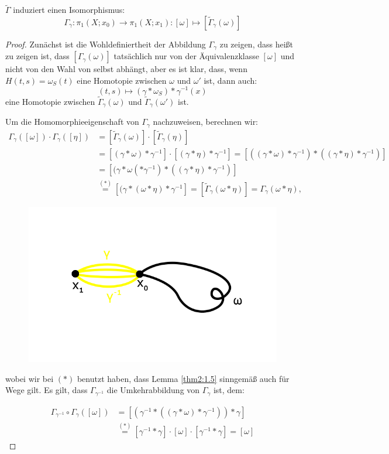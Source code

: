 \documentclass[a4paper,10pt]{scrartcl}
\begin{document}
\begin{st}\label{thm2:1.15}
 $\tilde \Gamma$ induziert einen Isomorphismus:
\[
 \Gamma_\gamma: \pi_1(X;x_0)\to \pi_1(X;x_1): [\omega] \mapsto [\tilde \Gamma_{\gamma}(\omega)]
\]
\end{st}
\begin{proof}
 Zunächst ist die Wohldefiniertheit der Abbildung $\Gamma_\gamma$ zu zeigen, dass heißt zu zeigen ist, dass $[\Gamma_{\gamma} (\omega)]$ tatsächlich nur von der Äquivalenzklasse $[\omega]$ und nicht von den Wahl von selbst abhängt, aber es ist klar, dass, wenn $H(t,s)=\omega_S(t)$ eine Homotopie zwischen $\omega$ und $\omega'$ ist, dann auch:
\[
 (t,s)\mapsto (\gamma*\omega_S)*\gamma^{-1}(x)
\]
eine Homotopie zwischen $\tilde \Gamma_{\gamma}(\omega)$ und $\tilde \Gamma_{\gamma}(\omega')$ ist. 

Um die Homomorphieeigenschaft von $\Gamma_{\gamma}$ nachzuweisen, berechnen wir: 
\begin{align*}
 \Gamma_{\gamma}([\omega])\cdot \Gamma_{\gamma} ([\eta])&=[\tilde \Gamma_{\gamma}(\omega)]\cdot [ \tilde \Gamma_{\gamma}(\eta)]\\
&=[(\gamma*\omega)*\gamma^{-1}]\cdot [(\gamma*\eta)*\gamma^{-1}]=[((\gamma*\omega)*\gamma^{-1})*((\gamma*\eta)*\gamma^{-1})]\\
&=[(\gamma*\omega(*\gamma^{-1})*((\gamma*\eta)*\gamma^{-1})]\\
&\stackrel{(*)}=[(\gamma*(\omega*\eta)*\gamma^{-1}]=[\tilde \Gamma_\gamma (\omega*\eta)]=\Gamma_\gamma(\omega*\eta),
\end{align*}

\begin{figure}[ht]
\centering
\includegraphics[scale=0.3]{fig67.png}
\end{figure}

wobei wir bei $(*)$ benutzt haben, dass Lemma \ref{thm2:1.5} sinngemäß auch für Wege gilt. Es gilt, dass $\Gamma_{\gamma^{-1}}$ die Umkehrabbildung von $\Gamma_\gamma$ ist, dem:

\begin{align*}
 \Gamma_{\gamma^{-1}}\circ \Gamma_\gamma ([\omega])&=[(\gamma^{-1}*((\gamma*\omega)*\gamma^{-1}))*\gamma]\\
 &\stackrel{(*)}=[\gamma^{-1}*\gamma]\cdot [\omega]\cdot [\gamma^{-1} * \gamma]=[\omega]
\end{align*}
\end{proof}
\end{document}
